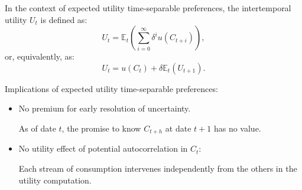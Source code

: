 \begin{frame}{}
\begin{footnotesize}
\begin{defn}\label{def:EUTSpref}
In the context of {\color{blue}expected utility time-separable preferences}, the intertemporal utility $U_t$ is defined as:
$$
U_t = \mathbb{E}_t\left(\sum_{i=0}^{\infty} \delta^{i}u(C_{t+i})\right),
$$
or, equivalently, as:
$$
U_t = u(C_t) + \delta \mathbb{E}_t\left(U_{t+1}\right).
$$
\end{defn}

\vspace{.5cm}
Implications of expected utility time-separable preferences:
	\begin{itemize}
		\item No premium for early resolution of uncertainty.
		
		As of date $t$, the promise to know $C_{t+h}$ at date $t+1$ has no value.
		\item No utility effect of potential autocorrelation in $C_t$:
		
		Each stream of consumption intervenes independently from the others in the utility computation.
	\end{itemize}
\end{footnotesize}
\end{frame}



